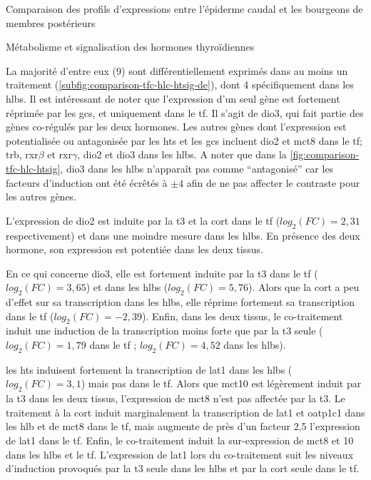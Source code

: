 \documentclass[../main.tex]{subfiles}
\begin{document}
\begin{chapter}{Comparaison des profils d'expressions entre l'épiderme caudal et les bourgeons de membres postérieurs}
\begin{section}{Métabolisme et signalisation des hormones thyroïdiennes}


La majorité d'entre eux (9) sont différentiellement exprimés dans au moins un traitement (\autoref{subfig:comparison-tfc-hlc-htsig-de}), dont 4 spécifiquement dans les \glspl{hlb}.
Il est intéressant de noter que l'expression d'un seul gène est fortement réprimée par les \glspl{gc}, et uniquement dans le \gls{tf}.
Il s'agit de \gls{dio3}, qui fait partie des gènes co-régulés par les deux hormones.
Les autres gènes dont l'expression est potentialisée ou antagonisée par les \glspl{ht} et les \glspl{gc} incluent \gls{dio2} et \gls{mct}8 dans le \gls{tf}; \gls{trb}, \gls{rxr}$\beta$ et \gls{rxr}$\gamma$, \gls{dio2} et \gls{dio3} dans les \glspl{hlb}.
A noter que dans la \autoref{fig:comparison-tfc-hlc-htsig}, \gls{dio3} dans les \glspl{hlb} n’apparaît pas comme ``antagonisé'' car les facteurs d'induction ont été écrêtés à $\pm 4$ afin de ne pas affecter le contraste pour les autres gènes.
\par
L'expression de \gls{dio2} est induite par la \gls{t3} et la \gls{cort} dans le \gls{tf} ($log_2(FC)=2,31$ respectivement) et dans une moindre mesure dans les \glspl{hlb}.
En présence des deux hormone, son expression est potentiée dans les deux tissus.
\par
En ce qui concerne \gls{dio3}, elle est fortement induite par la \gls{t3} dans le \gls{tf} ($log_2(FC)=3,65$) et dans les \glspl{hlb} ($log_2(FC)=5,76$).
Alors que la \gls{cort} a peu d'effet sur sa transcription dans les \glspl{hlb}, elle réprime fortement sa transcription dans le \gls{tf} ($log_2(FC)=-2,39$).
Enfin, dans les deux tissus, le co-traitement induit une induction de la transcription moins forte que par la \gls{t3} seule ($log_2(FC)=1,79$ dans le \gls{tf} ; $log_2(FC)=4,52$ dans les \glspl{hlb}).
\par
les \glspl{ht} induisent fortement la transcription de \gls{lat}1 dans les \glspl{hlb} ($log_2(FC)=3,1$) mais pas dans le \gls{tf}.
Alors que \gls{mct}10 est légèrement induit par la \gls{t3} dans les deux tissus, l'expression de \gls{mct}8 n'est pas affectée par la \gls{t3}.
Le traitement à la \gls{cort} induit marginalement la transcription de \gls{lat}1 et \gls{oatp}1c1 dans les \gls{hlb} et de \gls{mct}8 dans le \gls{tf}, mais augmente de près d'un facteur 2,5 l'expression de \gls{lat}1 dans le \gls{tf}.
Enfin, le co-traitement induit la sur-expression de \gls{mct}8 et 10 dans les \glspl{hlb} et le \gls{tf}.
L'expression de \gls{lat}1 lors du co-traitement suit les niveaux d'induction provoqués par la \gls{t3} seule dans les \glspl{hlb} et par la \gls{cort} seule dans le \gls{tf}.

\end{section}

\end{chapter}
\end{document}
